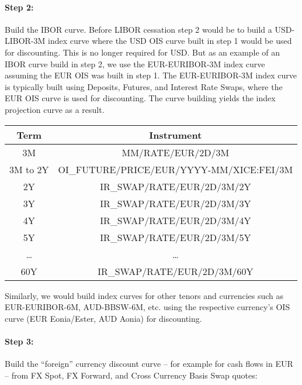 
\medskip
\paragraph*{Step 2:} Build the IBOR curve. Before LIBOR cessation step 2 would be to build a USD-LIBOR-3M index curve where the USD OIS curve built in step 1 would be used for
discounting. This is no longer required for USD. But as an example of an IBOR curve build in step 2, we use the EUR-EURIBOR-3M index curve assuming the EUR OIS was built in step 1. The EUR-EURIBOR-3M index curve is typically built using Deposits, Futures, and Interest Rate Swaps, where the EUR OIS curve is used for discounting. The curve building yields the index projection curve as a result.

{\small
\begin{center}
\begin{tabular}{|c|c|}
\hline
Term & Instrument \\
\hline
3M & MM/RATE/EUR/2D/3M \\
\hline
3M to 2Y & OI\_FUTURE/PRICE/EUR/YYYY-MM/XICE:FEI/3M \\
\hline
2Y & IR\_SWAP/RATE/EUR/2D/3M/2Y \\
3Y & IR\_SWAP/RATE/EUR/2D/3M/3Y \\
4Y & IR\_SWAP/RATE/EUR/2D/3M/4Y \\
5Y & IR\_SWAP/RATE/EUR/2D/3M/5Y \\
\dots & \dots \\
60Y & IR\_SWAP/RATE/EUR/2D/3M/60Y \\ 
\hline
\end{tabular}
\end{center}
}

Similarly, we would build index curves for other tenors and currencies
such as EUR-EURIBOR-6M, AUD-BBSW-6M, etc. using the respective
currency's OIS curve (EUR Eonia/Ester, AUD Aonia) for discounting.  
 
\medskip
\paragraph*{Step 3:} Build the ``foreign'' currency discount curve -- for
example for cash flows in EUR -- from FX Spot, FX Forward, and Cross
Currency Basis Swap quotes: 


